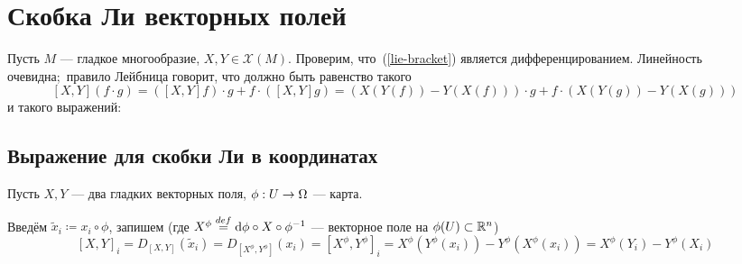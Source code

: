 \documentclass[a4paper]{report}
\begin{document}
    \section{Скобка Ли векторных полей}
    Пусть $M$ --- гладкое многообразие, $X, Y \in \mathscr{X}(M)$.
    Проверим, что~(\ref{lie-bracket}) является дифференцированием.
    Линейность очевидна;\ правило Лейбница говорит, что должно быть равенство такого
    \[[X, Y](f \cdot g) = ([X, Y]f) \cdot g + f \cdot ([X, Y]g) = (X(Y(f)) - Y(X(f))) \cdot g + f \cdot (X(Y(g)) - Y(X(g)))\]
    и такого выражений:
    \subsection{Выражение для скобки Ли в координатах}
    \label{coordinate-for-lie-bracket}
    Пусть $X, Y$ --- два гладких векторных поля, $\phi: U \rightarrow \Omega$ --- карта.

    Введём $\tilde{x}_i \coloneqq x_i \circ \phi$, запишем (где $X^\phi \overset{def}{=} \operatorname{d}\!\phi \circ X \circ \phi^{-1}$ --- векторное поле на $\phi(U) \subset \mathbb{R}^n$)
    \[[X, Y]_i = D_{[X, Y]}(\tilde{x}_i) =D_{[X^\phi, Y^\phi]}(x_i) = [X^\phi, Y^\phi]_i = X^\phi (Y^\phi(x_i)) - Y^\phi (X^\phi(x_i)) = X^{\phi}(Y_i) - Y^{\phi}(X_i) \]
\end{document}
